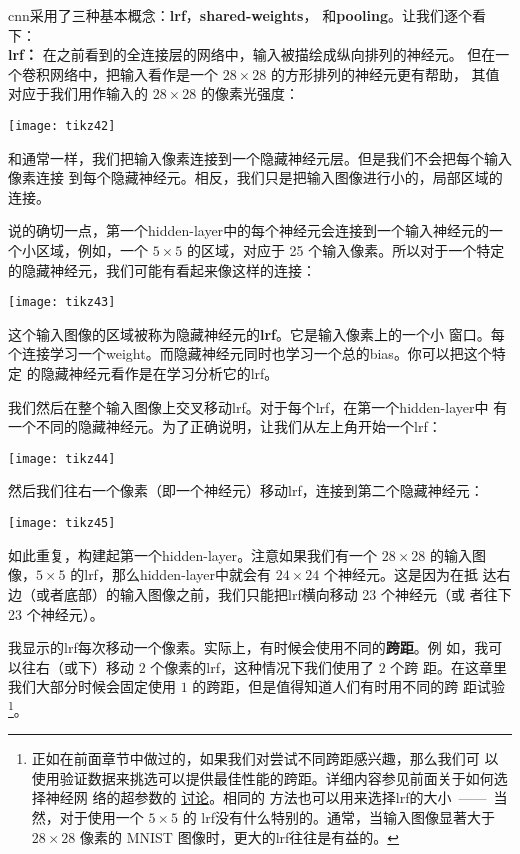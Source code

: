 \gls*{cnn}采用了三种基本概念：\textbf{\gls{lrf}}，\textbf{\gls{shared-weights}}，
和\textbf{\gls{pooling}}。让我们逐个看下：\\

\textbf{\gls*{lrf}：} 在之前看到的全连接层的网络中，输入被描绘成纵向排列的神经元。
但在一个卷积网络中，把输入看作是一个 $28 \times 28$ 的方形排列的神经元更有帮助，
其值对应于我们用作输入的 $28 \times 28$ 的像素光强度：
\begin{center}
  \texttt{[image: tikz42]}
\end{center}

和通常一样，我们把输入像素连接到一个隐藏神经元层。但是我们不会把每个输入像素连接
到每个隐藏神经元。相反，我们只是把输入图像进行小的，局部区域的连接。

说的确切一点，第一个\gls*{hidden-layer}中的每个神经元会连接到一个输入神经元的一
个小区域，例如，一个 $5 \times 5$ 的区域，对应于 25 个输入像素。所以对于一个特定
的隐藏神经元，我们可能有看起来像这样的连接：
\begin{center}
  \texttt{[image: tikz43]}
\end{center}

这个输入图像的区域被称为隐藏神经元的\textbf{\gls*{lrf}}。它是输入像素上的一个小
窗口。每个连接学习一个\gls*{weight}。而隐藏神经元同时也学习一个总的\gls*{bias}。你可以把这个特定
的隐藏神经元看作是在学习分析它的\gls*{lrf}。

我们然后在整个输入图像上交叉移动\gls*{lrf}。对于每个\gls*{lrf}，在第一个\gls*{hidden-layer}中
有一个不同的隐藏神经元。为了正确说明，让我们从左上角开始一个\gls*{lrf}：
\begin{center}
  \texttt{[image: tikz44]}
\end{center}

然后我们往右一个像素（即一个神经元）移动\gls*{lrf}，连接到第二个隐藏神经元：
\begin{center}
  \texttt{[image: tikz45]}
\end{center}

如此重复，构建起第一个\gls*{hidden-layer}。注意如果我们有一个 $28 \times 28$ 的输入图像，$5
\times 5$ 的\gls*{lrf}，那么\gls*{hidden-layer}中就会有 $24 \times 24$ 个神经元。这是因为在抵
达右边（或者底部）的输入图像之前，我们只能把\gls*{lrf}横向移动 23 个神经元（或
  者往下 23 个神经元）。

我显示的\gls*{lrf}每次移动一个像素。实际上，有时候会使用不同的\textbf{跨距}。例
如，我可以往右（或下）移动 $2$ 个像素的\gls*{lrf}，这种情况下我们使用了 $2$ 个跨
距。在这章里我们大部分时候会固定使用 $1$ 的跨距，但是值得知道人们有时用不同的跨
距试验\footnote{正如在前面章节中做过的，如果我们对尝试不同跨距感兴趣，那么我们可
  以使用验证数据来挑选可以提供最佳性能的跨距。详细内容参见前面关于如何选择神经网
  络的超参数的%
  \hyperref[sec:how_to_choose_a_neural_network's_hyper-parameters]{讨论}。相同的
  方法也可以用来选择\gls*{lrf}的大小~——~当然，对于使用一个 $5 \times 5$ 的%
  \gls*{lrf}没有什么特别的。通常，当输入图像显著大于 $28 \times 28$ 像素的 MNIST
  图像时，更大的\gls*{lrf}往往是有益的。}。\\

